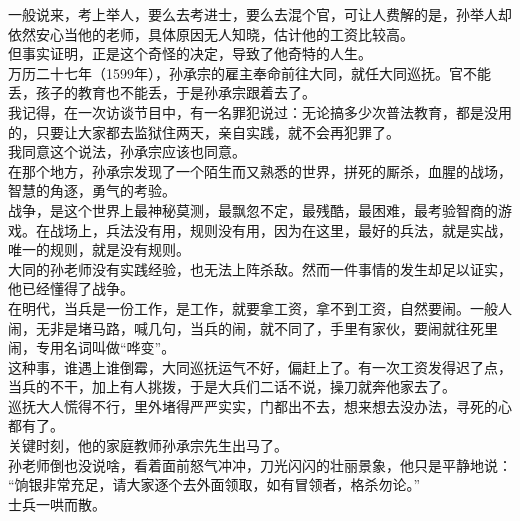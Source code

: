 \begin{multicols}{\theparacolNo}
一般说来，考上举人，要么去考进士，要么去混个官，可让人费解的是，孙举人却依然安心当他的老师，具体原因无人知晓，估计他的工资比较高。\\

但事实证明，正是这个奇怪的决定，导致了他奇特的人生。\\

万历二十七年（1599年），孙承宗的雇主奉命前往大同，就任大同巡抚。官不能丢，孩子的教育也不能丢，于是孙承宗跟着去了。\\

我记得，在一次访谈节目中，有一名罪犯说过：无论搞多少次普法教育，都是没用的，只要让大家都去监狱住两天，亲自实践，就不会再犯罪了。\\

我同意这个说法，孙承宗应该也同意。\\

在那个地方，孙承宗发现了一个陌生而又熟悉的世界，拼死的厮杀，血腥的战场，智慧的角逐，勇气的考验。\\

战争，是这个世界上最神秘莫测，最飘忽不定，最残酷，最困难，最考验智商的游戏。在战场上，兵法没有用，规则没有用，因为在这里，最好的兵法，就是实战，唯一的规则，就是没有规则。\\

大同的孙老师没有实践经验，也无法上阵杀敌。然而一件事情的发生却足以证实，他已经懂得了战争。\\

在明代，当兵是一份工作，是工作，就要拿工资，拿不到工资，自然要闹。一般人闹，无非是堵马路，喊几句，当兵的闹，就不同了，手里有家伙，要闹就往死里闹，专用名词叫做“哗变”。\\

这种事，谁遇上谁倒霉，大同巡抚运气不好，偏赶上了。有一次工资发得迟了点，当兵的不干，加上有人挑拨，于是大兵们二话不说，操刀就奔他家去了。\\

巡抚大人慌得不行，里外堵得严严实实，门都出不去，想来想去没办法，寻死的心都有了。\\

关键时刻，他的家庭教师孙承宗先生出马了。\\

孙老师倒也没说啥，看着面前怒气冲冲，刀光闪闪的壮丽景象，他只是平静地说：\\

“饷银非常充足，请大家逐个去外面领取，如有冒领者，格杀勿论。”\\

士兵一哄而散。\\


\end{multicols}

